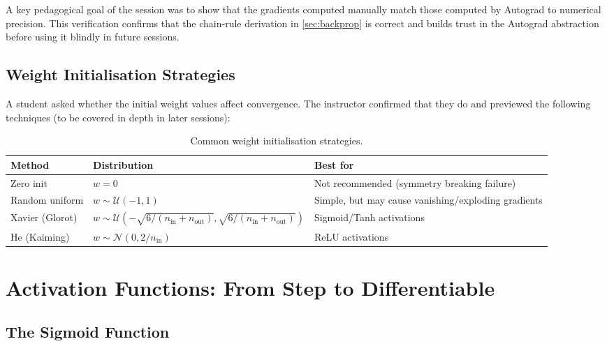 \documentclass[12pt,a4paper]{article}
\begin{document}
\begin{keyinsight}[title=Manual vs.\ Autograd Verification]
A key pedagogical goal of the session was to show that the gradients computed
manually match those computed by Autograd to numerical precision.  This
verification confirms that the chain-rule derivation in
\cref{sec:backprop} is correct and builds trust in the Autograd abstraction
before using it blindly in future sessions.
\end{keyinsight}

\subsection{Weight Initialisation Strategies}
\label{sub:weight-init}

A student asked whether the initial weight values affect convergence.  The
instructor confirmed that they do and previewed the following techniques
(to be covered in depth in later sessions):

\begin{table}[htbp]
\centering
\caption{Common weight initialisation strategies.}
\label{tab:weight-init}
\begin{tabularx}{\linewidth}{lXX}
\toprule
\textbf{Method} & \textbf{Distribution} & \textbf{Best for} \\
\midrule
Zero init & $w = 0$ & Not recommended (symmetry breaking failure) \\
Random uniform & $w \sim \mathcal{U}(-1,1)$ & Simple, but may cause vanishing/exploding gradients \\
Xavier (Glorot) & $w \sim \mathcal{U}\!\left(-\sqrt{6/(n_\text{in}+n_\text{out})},\sqrt{6/(n_\text{in}+n_\text{out})}\right)$ & Sigmoid/Tanh activations \\
He (Kaiming) & $w \sim \mathcal{N}(0, 2/n_\text{in})$ & ReLU activations \\
\bottomrule
\end{tabularx}
\end{table}

\section{Activation Functions: From Step to Differentiable}
\label{sec:activations}

\subsection{The Sigmoid Function}
\end{document}
